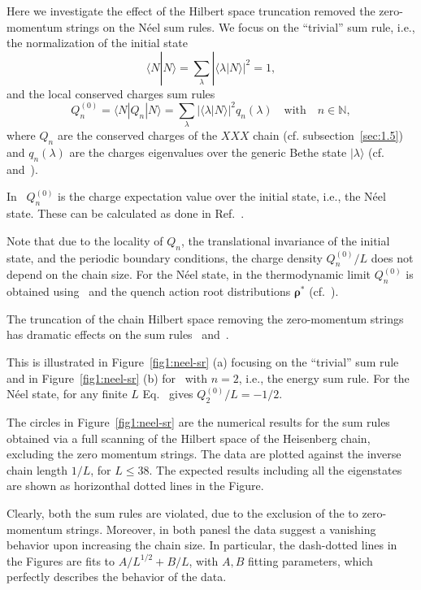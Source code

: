 \documentclass[11pt]{iopart}
\begin{document}
Here we investigate the effect of the Hilbert space truncation removed the 
zero-momentum strings on the N\'eel sum rules. 
We focus on the ``trivial'' sum rule, i.e., the normalization of the initial 
state 
%
\begin{equation}
\label{sr-trivial}
\langle N|N\rangle=\sum\limits_{\lambda}|\langle\lambda|N\rangle|^2=1, 
\end{equation}
%
and the local conserved charges sum rules 
%
\begin{equation}
\label{sr-charge}
Q_n^{(0)}=\langle N|Q_n|N\rangle=\sum\limits_{\lambda}|\langle\lambda|N\rangle|^2
q_{n}(\lambda)\quad\textrm{with}\quad n\in\mathbb{N}, 
\end{equation}
%
where $Q_n$ are the conserved charges of the $XXX$ chain (cf. 
subsection~\ref{sec:1.5}) and $q_n(\lambda)$ are the charges eigenvalues over 
the generic Bethe state $|\lambda\rangle$ (cf.~ and~). 

In~ $Q_n^{(0)}$ is the charge expectation value over the initial 
state, i.e., the N\'eel state. These can be calculated as done in 
Ref.~\cite{fagotti-2013}. 

Note that due to the locality of $Q_n$, the translational invariance of the initial 
state, and the periodic boundary conditions, the charge density $Q_n^{(0)}/L$ does 
not depend on the chain size. For the N\'eel state, in the thermodynamic limit 
$Q_n^{(0)}$ is obtained using~ and the quench action root distributions 
$\pmb{\rho}^*$ (cf.~). 

The truncation of the chain Hilbert space removing the zero-momentum strings has 
dramatic effects on the sum rules~ and~. 

This is illustrated in Figure~\ref{fig1:neel-sr} (a) focusing on the ``trivial'' 
sum rule~ and in Figure~\ref{fig1:neel-sr} (b) for~ 
with $n=2$, i.e., the energy sum rule. 
For the N\'eel state, for any finite $L$ Eq.~ gives $Q^{(0)}_2/L=-1/2$. 

The circles in Figure~\ref{fig1:neel-sr} are the numerical results for the sum rules 
obtained via a full scanning of the Hilbert space of the Heisenberg chain, excluding 
the zero momentum strings. The data are plotted against the inverse chain length $1/L$, 
for $L\le 38$. The expected results including all the eigenstates are shown as 
horizonthal dotted lines in the Figure. 

Clearly, both the sum rules are violated, due to the exclusion of the to zero-momentum 
strings. Moreover, in both panesl the data suggest a vanishing behavior upon increasing 
the chain size. In particular, the dash-dotted lines in the Figures are fits to  
$A/L^{1/2}+B/L$, with $A,B$ fitting parameters, which perfectly describes the behavior 
of the data. 
\end{document}
